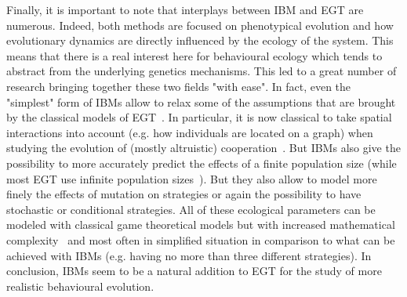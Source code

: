     Finally, it is important to note that interplays between IBM and EGT are numerous. Indeed, both methods are focused on phenotypical evolution and how evolutionary dynamics are directly influenced by the ecology of the system. This means that there is a real interest here for behavioural ecology which tends to abstract from the underlying genetics mechanisms. This led to a great number of research bringing together these two fields "with ease". In fact, even the "simplest" form of IBMs allow to relax some of the assumptions that are brought by the classical models of EGT~\cite{Adami2014}. In particular, it is now classical to take spatial interactions into account (e.g. how individuals are located on a graph) when studying the evolution of (mostly altruistic) cooperation~\cite{Hauert2004}. But IBMs also give the possibility to more accurately predict the effects of a finite population size (while most EGT use infinite population sizes~\cite{Hauert2009}). But they also allow to model more finely the effects of mutation on strategies or again the possibility to have stochastic or conditional strategies. All of these ecological parameters can be modeled with classical game theoretical models but with increased mathematical complexity~\cite{Hauert2009} and most often in simplified situation in comparison to what can be achieved with IBMs (e.g. having no more than three different strategies). In conclusion, IBMs seem to be a natural addition to EGT for the study of more realistic behavioural evolution.



